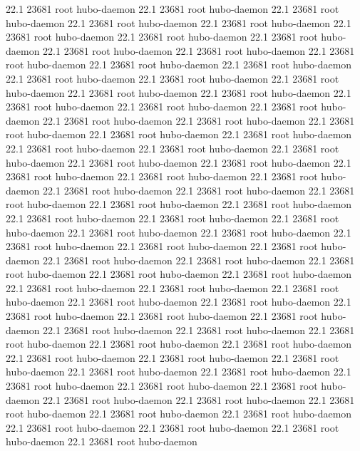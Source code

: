 22.1 23681 root     hubo-daemon
22.1 23681 root     hubo-daemon
22.1 23681 root     hubo-daemon
22.1 23681 root     hubo-daemon
22.1 23681 root     hubo-daemon
22.1 23681 root     hubo-daemon
22.1 23681 root     hubo-daemon
22.1 23681 root     hubo-daemon
22.1 23681 root     hubo-daemon
22.1 23681 root     hubo-daemon
22.1 23681 root     hubo-daemon
22.1 23681 root     hubo-daemon
22.1 23681 root     hubo-daemon
22.1 23681 root     hubo-daemon
22.1 23681 root     hubo-daemon
22.1 23681 root     hubo-daemon
22.1 23681 root     hubo-daemon
22.1 23681 root     hubo-daemon
22.1 23681 root     hubo-daemon
22.1 23681 root     hubo-daemon
22.1 23681 root     hubo-daemon
22.1 23681 root     hubo-daemon
22.1 23681 root     hubo-daemon
22.1 23681 root     hubo-daemon
22.1 23681 root     hubo-daemon
22.1 23681 root     hubo-daemon
22.1 23681 root     hubo-daemon
22.1 23681 root     hubo-daemon
22.1 23681 root     hubo-daemon
22.1 23681 root     hubo-daemon
22.1 23681 root     hubo-daemon
22.1 23681 root     hubo-daemon
22.1 23681 root     hubo-daemon
22.1 23681 root     hubo-daemon
22.1 23681 root     hubo-daemon
22.1 23681 root     hubo-daemon
22.1 23681 root     hubo-daemon
22.1 23681 root     hubo-daemon
22.1 23681 root     hubo-daemon
22.1 23681 root     hubo-daemon
22.1 23681 root     hubo-daemon
22.1 23681 root     hubo-daemon
22.1 23681 root     hubo-daemon
22.1 23681 root     hubo-daemon
22.1 23681 root     hubo-daemon
22.1 23681 root     hubo-daemon
22.1 23681 root     hubo-daemon
22.1 23681 root     hubo-daemon
22.1 23681 root     hubo-daemon
22.1 23681 root     hubo-daemon
22.1 23681 root     hubo-daemon
22.1 23681 root     hubo-daemon
22.1 23681 root     hubo-daemon
22.1 23681 root     hubo-daemon
22.1 23681 root     hubo-daemon
22.1 23681 root     hubo-daemon
22.1 23681 root     hubo-daemon
22.1 23681 root     hubo-daemon
22.1 23681 root     hubo-daemon
22.1 23681 root     hubo-daemon
22.1 23681 root     hubo-daemon
22.1 23681 root     hubo-daemon
22.1 23681 root     hubo-daemon
22.1 23681 root     hubo-daemon
22.1 23681 root     hubo-daemon
22.1 23681 root     hubo-daemon
22.1 23681 root     hubo-daemon
22.1 23681 root     hubo-daemon
22.1 23681 root     hubo-daemon
22.1 23681 root     hubo-daemon
22.1 23681 root     hubo-daemon
22.1 23681 root     hubo-daemon
22.1 23681 root     hubo-daemon
22.1 23681 root     hubo-daemon
22.1 23681 root     hubo-daemon
22.1 23681 root     hubo-daemon
22.1 23681 root     hubo-daemon
22.1 23681 root     hubo-daemon
22.1 23681 root     hubo-daemon
22.1 23681 root     hubo-daemon
22.1 23681 root     hubo-daemon
22.1 23681 root     hubo-daemon
